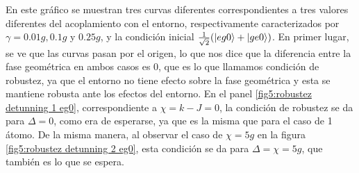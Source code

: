 En este gráfico se muestran tres curvas diferentes correspondientes a tres valores diferentes del acoplamiento con el entorno, respectivamente caracterizados por $\gamma=0.01g,0.1g$ y $0.25g$, y la condición inicial $\frac{1}{\sqrt{2}}(\ket{eg0}+\ket{ge0})$. En primer lugar, se ve que las curvas pasan por el origen, lo que nos dice que la diferencia entre la fase geométrica en ambos casos es 0, que es lo que llamamos condición de robustez, ya que el entorno no tiene efecto sobre la fase geométrica y esta se mantiene robusta ante los efectos del entorno. En el panel \ref{fig5:robustez detunning 1 eg0}, correspondiente a $\chi=k-J=0$, la condición de robustez se da para $\Delta=0$, como era de esperarse, ya que es la misma que para el caso de 1 átomo. De la misma manera, al observar el caso de $\chi=5g$ en la figura \ref{fig5:robustez detunning 2 eg0}, esta condición se da para $\Delta=\chi=5g$, que también es lo que se espera.
